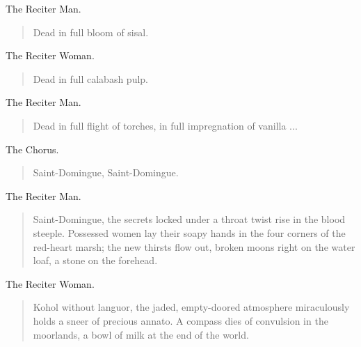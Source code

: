 \documentclass[letterpaper,article,12pt,oneside,notitlepage]{memoir}
\begin{document}
\begin{center}The Reciter Man.\end{center}

\begin{verse}
\hspace{1cm} Dead in full bloom of sisal. \\
\end{verse}

\begin{center}The Reciter Woman.\end{center}

\begin{verse}
Dead in full calabash pulp. \\
\end{verse}

\begin{center}The Reciter Man.\end{center}

\begin{verse}
\hspace{1cm} Dead in full flight of torches, in full impregnation of vanilla ... \\
\end{verse}

\begin{center}The Chorus.\end{center}

\begin{verse}
\hspace{1cm} Saint-Domingue, Saint-Domingue. \\
\end{verse}

\begin{center}The Reciter Man.\end{center}

\begin{verse}
\indent Saint-Domingue, the secrets locked under a throat twist rise in the blood steeple. Possessed women lay their soapy hands in the four corners of the red-heart marsh; the new thirsts flow out, broken moons right on the water loaf, a stone on the forehead. \\
\end{verse}

\begin{center}The Reciter Woman.\end{center}

\begin{verse}
\indent Kohol without languor, the jaded, empty-doored atmosphere miraculously holds a sneer of precious annato. A compass dies of convulsion in the moorlands, a bowl of milk at the end of the world. \\
\end{verse}
\end{document}
